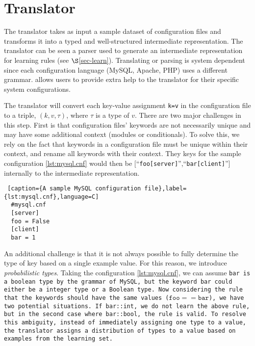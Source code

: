 
\section{Translator}
\label{sec-trans}

The translator takes as input a sample dataset of configuration files and transforms it into a typed and well-structured intermediate representation.
The translator can be seen a parser used to generate an intermediate representation for learning rules (see $\S$\ref{sec-learn}).
Translating or parsing is system dependent since each configuration language (MySQL, Apache, PHP) uses a different grammar.
\app allows users to provide extra help to the translator for their specific system configurations.

The translator will convert each key-value assignment {\tt k=v} in the configuration file to a triple, $(k, v, \tau)$, where $\tau$ is a type of $v$. 
There are two major challenges in this step.
First is that configuration files' keywords are not necessarily unique and may have some additional context (modules or conditionals).
To solve this, we rely on the fact that keywords in a configuration file must be unique within their context, and rename all keywords with their context.
They keys for the sample configuration \ref{lst:mysql.cnf} would then be [``{\tt foo[server]}'',``{\tt bar[client]}''] internally to the intermediate representation.


\begin{lstlisting} [caption={A sample MySQL configuration file},label={lst:mysql.cnf},language=C]
  #mysql.cnf
  [server]
  foo = False
  [client]
  bar = 1
\end{lstlisting}

An additional challenge is that it is not always possible to fully determine the type of key based on a single example value. 
For this reason, we introduce {\emph {probabilistic types}}.
Taking the configuration \ref{lst:mysql.cnf}, we can assume \tt{bar} is a boolean type by the grammar of MySQL,
  but the keyword {\tt bar} could either be a integer type or a Boolean type.
Now considering the rule that the keywords should have the same values ($\texttt{foo}==\texttt{bar}$), we have two potential situations.
If {\tt bar::int}, we do not learn the above rule, but in the second case where {\tt bar::bool}, the rule is valid.
To resolve this ambiguity, instead of immediately assigning one type to a value, the translator assigns a distribution of types to a value based on examples from the learning set.

